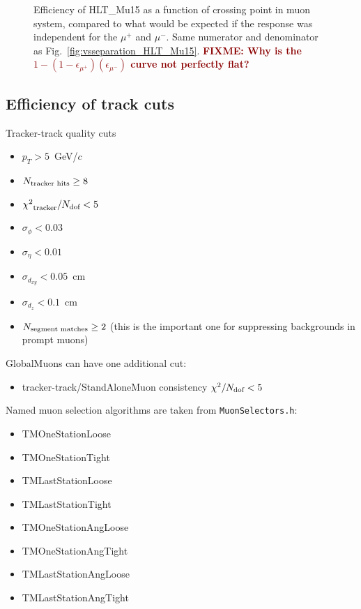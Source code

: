 \documentclass[12pt]{article}
\newcommand{\fixme}[1]{\textcolor{darkred}{\bf FIXME: #1}}
\newcommand{\s}[1]{{\mbox{\scriptsize #1}}}
\begin{document}
\begin{figure}[p]
\caption{Efficiency of HLT\_Mu15 as a function of crossing point in
  muon system, compared to what would be expected if the response was
  independent for the $\mu^+$ and $\mu^-$.  Same numerator and
  denominator as Fig.~\ref{fig:vsseparation_HLT_Mu15}.  \fixme{Why is
    the $1 - (1 - \epsilon_{\mu^+})(\epsilon_{\mu^-})$ curve not
    perfectly flat?} \label{fig:vsmuonpos_HLT_Mu15}}
\end{figure}

\clearpage

\subsection{Efficiency of track cuts}

Tracker-track quality cuts
\begin{itemize}
\item $p_T > 5$~GeV/$c$
\item $N_\s{tracker hits} \ge 8$
\item ${\chi^2}_\s{tracker}/N_\s{dof} < 5$
\item $\sigma_\phi < 0.03$
\item $\sigma_\eta < 0.01$
\item $\sigma_{d_{xy}} < 0.05$~cm
\item $\sigma_{d_z} < 0.1$~cm
\item $N_\s{segment matches} \ge 2$ (this is the important one for suppressing backgrounds in prompt muons)
\end{itemize}

GlobalMuons can have one additional cut:
\begin{itemize}
\item tracker-track/StandAloneMuon consistency $\chi^2/N_\s{dof} < 5$
\end{itemize}

Named muon selection algorithms are taken from {\tt MuonSelectors.h}:
\begin{itemize}
\item TMOneStationLoose
\item TMOneStationTight
\item TMLastStationLoose
\item TMLastStationTight
\item TMOneStationAngLoose
\item TMOneStationAngTight
\item TMLastStationAngLoose
\item TMLastStationAngTight
\end{itemize}
\end{document}
